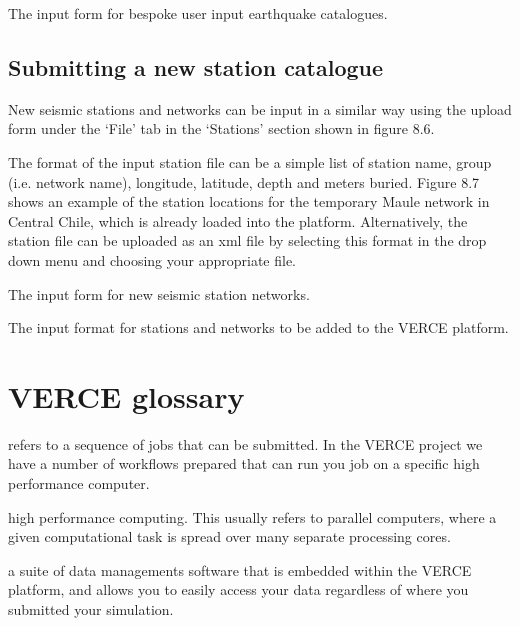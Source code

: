 \documentclass[english]{book}
\begin{document}

 The input form for bespoke user input earthquake
catalogues.


\section{Submitting a new station catalogue}
\label{\detokenize{Section8:submitting-a-new-station-catalogue}}
New seismic stations and networks can be input in a similar way using
the upload form under the ‘File’ tab in the ‘Stations’ section shown in
figure 8.6.

The format of the input station file can be a simple list of station
name, group (i.e. network name), longitude, latitude, depth and meters
buried. Figure 8.7 shows an example of the station locations for the
temporary Maule network in Central Chile, which is already loaded into
the platform. Alternatively, the station file can be uploaded as an xml
file by selecting this format in the drop down menu and choosing your
appropriate file.


 The input form for new seismic station networks.


 The input format for stations and networks to be added
to the VERCE platform.


\chapter{VERCE glossary}
\label{\detokenize{Glossary::doc}}\label{\detokenize{Glossary:verce-glossary}}

 \textendash{} refers to a sequence of jobs that can be submitted. In
the VERCE project we have a number of workflows prepared that can run
you job on a specific high performance computer.

 \textendash{} high performance computing. This usually refers to parallel
computers, where a given computational task is spread over many separate
processing cores.

 \textendash{} a suite of data managements software that is embedded within
the VERCE platform, and allows you to easily access your data regardless
of where you submitted your simulation.
\end{document}
